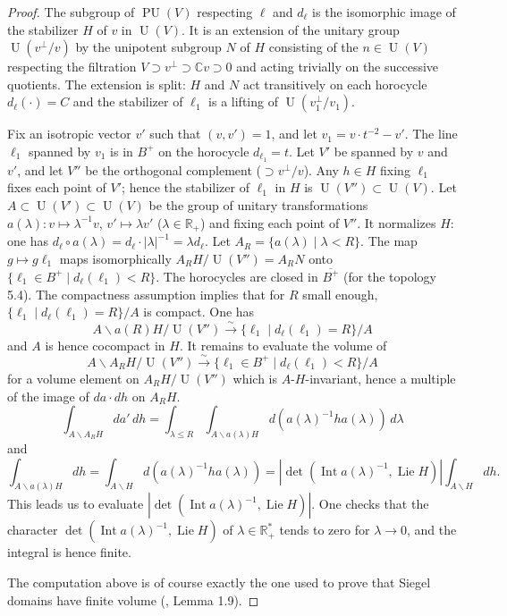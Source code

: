 \documentclass[12pt,a4paper]{article}
\theoremstyle{plain}
\theoremstyle{definition}
\theoremstyle{remark}
\DeclareMathOperator{\PU}{PU}
\newcommand{\CC}{\mathbb{C}}
\newcommand{\RR}{\mathbb{R}}
\numberwithin{equation}{section}
\providecommand{\CC}{\mathbb{C}}
\providecommand{\RR}{\mathbb{R}}
\providecommand{\U}{\operatorname{U}}
\providecommand{\Int}{\operatorname{Int}}
\providecommand{\Lie}{\operatorname{Lie}}
\begin{document}
\begin{proof}
The subgroup of $\PU(V)$ respecting $\ell$ and $d_\ell$ is the isomorphic image of the stabilizer $H$ of $v$ in $\U(V)$. It is an extension of the unitary group $\U(v^\perp/v)$ by the unipotent subgroup $N$ of $H$ consisting of the $n \in \U(V)$ respecting the filtration $V \supset v^\perp \supset \CC v \supset 0$ and acting trivially on the successive quotients. The extension is split: $H$ and $N$ act transitively on each horocycle $d_\ell(\cdot) = C$ and the stabilizer of $\ell_1$ is a lifting of $\U(v_1^\perp/v_1)$.

Fix an isotropic vector $v'$ such that $(v, v') = 1$, and let $v_1 = v \cdot t^{-2} - v'$. The line $\ell_1$ spanned by $v_1$ is in $B^+$ on the horocycle $d_{\ell_1} = t$. Let $V'$ be spanned by $v$ and $v'$, and let $V''$ be the orthogonal complement ($\supset v^\perp/v$). Any $h \in H$ fixing $\ell_1$ fixes each point of $V'$; hence the stabilizer of $\ell_1$ in $H$ is $\U(V'') \subset \U(V)$. Let $A \subset \U(V') \subset \U(V)$ be the group of unitary transformations $a(\lambda): v \mapsto \lambda^{-1} v$, $v' \mapsto \lambda v'$ ($\lambda \in \RR_+$) and fixing each point of $V''$. It normalizes $H$: one has $d_\ell \circ a(\lambda) = d_\ell \cdot |\lambda|^{-1} = \lambda d_\ell$. Let $A_R = \{a(\lambda) \mid \lambda < R\}$. The map $g \mapsto g\ell_1$ maps isomorphically $A_R H/\U(V'') = A_R N$ onto $\{\ell_1 \in B^+ \mid d_\ell(\ell_1) < R\}$. The horocycles are closed in $\overline{B^+}$ (for the topology 5.4). The compactness assumption implies that for $R$ small enough, $\{\ell_1 \mid d_\ell(\ell_1) = R\}/A$ is compact. One has
\[
A \backslash a(R) H / \U(V'') \xrightarrow{\sim} \{\ell_1 \mid d_\ell(\ell_1) = R\}/A
\]
and $A$ is hence cocompact in $H$. It remains to evaluate the volume of
\[
A \backslash A_R H / \U(V'') \xrightarrow{\sim} \{\ell_1 \in B^+ \mid d_\ell(\ell_1) < R\}/A
\]
for a volume element on $A_R H / \U(V'')$ which is $A$-$H$-invariant, hence a multiple of the image of $da \cdot dh$ on $A_R H$.
\[
\int_{A \backslash A_R H} da' \, dh = \int_{\lambda \leq R} \int_{A \backslash a(\lambda) H} d(a(\lambda)^{-1} h a(\lambda)) \, d\lambda
\]
and
\[
\int_{A \backslash a(\lambda) H} dh = \int_{A \backslash H} d(a(\lambda)^{-1} h a(\lambda)) = |\det(\Int a(\lambda)^{-1}, \Lie H)| \int_{A \backslash H} dh.
\]
This leads us to evaluate $|\det(\Int a(\lambda)^{-1}, \Lie H)|$. One checks that the character $\det(\Int a(\lambda)^{-1}, \Lie H)$ of $\lambda \in \RR_+^*$ tends to zero for $\lambda \to 0$, and the integral is hence finite.

The computation above is of course exactly the one used to prove that Siegel domains have finite volume (\cite{Borel}, Lemma 1.9).
\end{proof}
\end{document}
